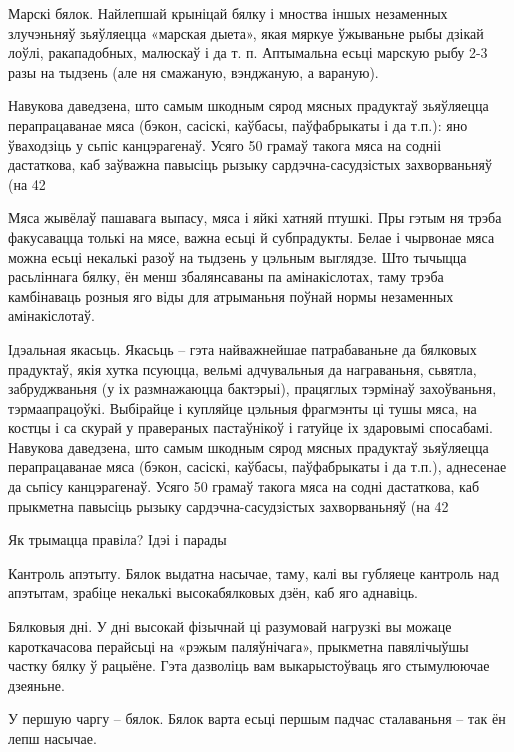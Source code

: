 Марскі бялок.
Найлепшай крыніцай бялку і мноства іншых незаменных злучэньняў зьяўляецца «марская дыета», якая мяркуе ўжываньне рыбы дзікай лоўлі, ракападобных, малюскаў і да т. п. Аптымальна есьці марскую рыбу 2-3 разы на тыдзень (але ня смажаную, вэнджаную, а вараную).

Навукова даведзена, што самым шкодным сярод мясных прадуктаў зьяўляецца перапрацаванае мяса (бэкон, сасіскі, каўбасы, паўфабрыкаты і да т.п.): яно ўваходзіць у сьпіс канцэрагенаў. Усяго 50 грамаў такога мяса на содніі дастаткова, каб заўважна павысіць рызыку сардэчна-сасудзістых захворваньняў (на 42%

Мяса жывёлаў пашавага выпасу, мяса і яйкі хатняй птушкі.
Пры гэтым ня трэба факусавацца толькі на мясе, важна есьці й субпрадукты. Белае і чырвонае мяса можна есьці некалькі разоў на тыдзень у цэльным выглядзе. Што тычыцца расьліннага бялку, ён менш збалянсаваны па амінакіслотах, таму трэба камбінаваць розныя яго віды для атрыманьня поўнай нормы незаменных амінакіслотаў.

Ідэальная якасьць.
Якасьць – гэта найважнейшае патрабаваньне да бялковых прадуктаў, якія хутка псуюцца, вельмі адчувальныя да награваньня, сьвятла, забруджваньня (у іх размнажаюцца бактэрыі), працяглых тэрмінаў захоўваньня, тэрмаапрацоўкі. Выбірайце і купляйце цэльныя фрагмэнты ці тушы мяса, на костцы і са скурай у правераных пастаўнікоў і гатуйце іх здаровымі спосабамі. Навукова даведзена, што самым шкодным сярод мясных прадуктаў зьяўляецца перапрацаванае мяса (бэкон, сасіскі, каўбасы, паўфабрыкаты і да т.п.), аднесенае да сьпісу канцэрагенаў. Усяго 50 грамаў такога мяса на содні дастаткова, каб прыкметна павысіць рызыку сардэчна-сасудзістых захворваньняў (на 42%

Як трымацца правіла? Ідэі і парады

Кантроль апэтыту.
Бялок выдатна насычае, таму, калі вы губляеце кантроль над апэтытам, зрабіце некалькі высокабялковых дзён, каб яго аднавіць.

Бялковыя дні.
У дні высокай фізычнай ці разумовай нагрузкі вы можаце кароткачасова перайсьці на «рэжым паляўнічага», прыкметна павялічыўшы частку бялку ў рацыёне. Гэта дазволіць вам выкарыстоўваць яго стымулюючае дзеяньне.

У першую чаргу – бялок.
Бялок варта есьці першым падчас сталаваньня – так ён лепш насычае.

